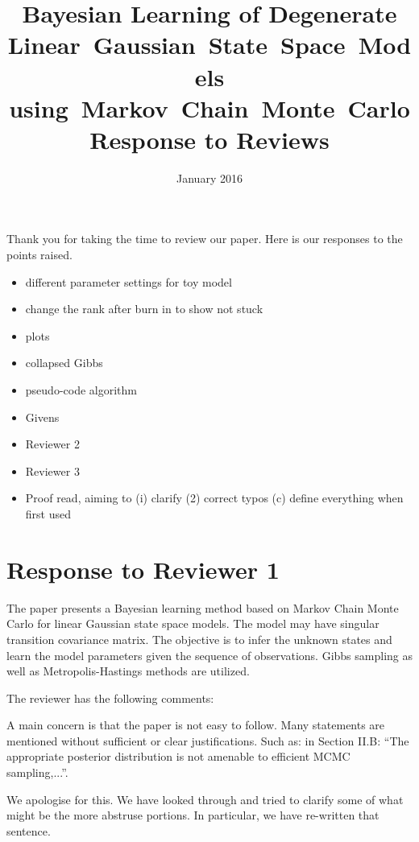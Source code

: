 \documentclass{article}
\title{Bayesian Learning of Degenerate Linear~Gaussian~State~Space~Models using~Markov~Chain~Monte~Carlo \\ Response to Reviews}
\date{January 2016}
\newenvironment{review}[0]{\begin{itshape}\color{Gray}\noindent}{\end{itshape}\vspace{0.4cm}}
\newenvironment{response}[0]{\noindent}{\vspace{0.4cm}}
\newcommand{\meta}[1]{{\color{red}\em #1}}
\begin{document}
\maketitle

Thank you for taking the time to review our paper. Here is our responses to the points raised.

\meta{
\begin{itemize}
 \item different parameter settings for toy model
 \item change the rank after burn in to show not stuck
 \item plots
 \item collapsed Gibbs
 \item pseudo-code algorithm
 \item Givens
 \item Reviewer 2
 \item Reviewer 3
 \item Proof read, aiming to (i) clarify (2) correct typos (c) define everything when first used
\end{itemize}

}

\section*{Response to Reviewer 1}

\begin{review}
The paper presents a Bayesian learning method based on Markov Chain Monte Carlo for linear Gaussian state space models. The model may have singular transition covariance matrix. The objective is to infer the unknown states and learn the model parameters given the sequence of observations. Gibbs sampling as well as Metropolis-Hastings methods are utilized.

The reviewer has the following comments:

A main concern is that the paper is not easy to follow. Many statements are mentioned without sufficient or clear justifications. Such as: in Section II.B: ``The appropriate posterior distribution is not amenable to efficient MCMC sampling,...''.
\end{review}

\begin{response}
 We apologise for this. We have looked through and tried to clarify some of what might be the more abstruse portions. In particular, we have re-written that sentence.
\end{response}
\end{document}
